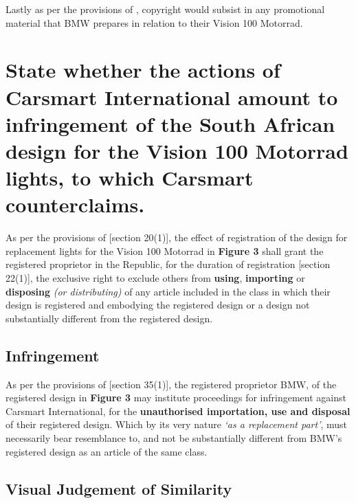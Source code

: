 \documentclass[11pt]{article}
\begin{document}
Lastly as per the provisions of
\cite{rsa78_copyrightact,wto17_trips,wipo96_copyright_treaty,wipo86_berne},
copyright would subsist in any promotional material that BMW prepares in
relation to their Vision 100 Motorrad.

\section{State whether the actions of Carsmart International amount to infringement of the South African design for the Vision 100 Motorrad lights, to which Carsmart counterclaims.}
\label{sec:orgf82121c}

As per the provisions of [section 20(1)]\cite{rsa93_designs_act}, the effect of
registration of the design for replacement lights for the Vision 100 Motorrad in
\textbf{Figure 3} shall grant the registered proprietor in the Republic, for the
duration of registration [section 22(1)]\cite{rsa93_designs_act}, the exclusive
right to exclude others from \textbf{using}, \textbf{importing} or \textbf{disposing} \emph{(or
distributing)} of any article included in the class in which their design is
registered and embodying the registered design or a design not substantially
different from the registered design.

\subsection{Infringement}
\label{sec:orga70327c}

As per the provisions of [section 35(1)]\cite{rsa93_designs_act}, the registered
proprietor BMW, of the registered design in \textbf{Figure 3} may institute proceedings
for infringement against Carsmart International, for the \textbf{unauthorised
importation, use and disposal} of their registered design. Which by its very
nature \emph{`as a replacement part'}, must necessarily bear resemblance to, and not be
substantially different from BMW's registered design as an article of the same
class.

\subsection{Visual Judgement of Similarity}
\label{sec:orgfb09855}
\end{document}
